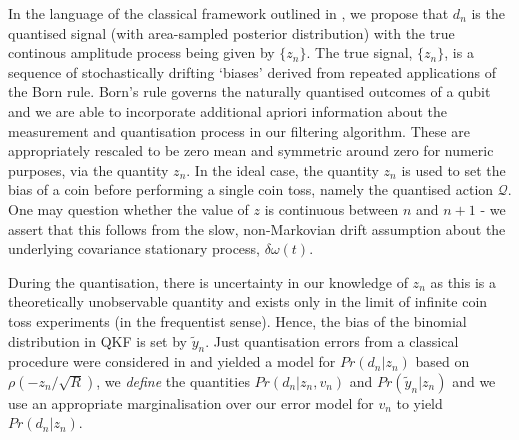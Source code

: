In the language of the classical framework outlined in \cite{karlsson2005, widrow1996}, we propose that $d_n$ is the quantised signal (with area-sampled posterior distribution) with the true continous amplitude process being given by $\{z_n \}$. The true signal, $\{z_n\}$, is a sequence of stochastically drifting `biases' derived from repeated applications of the Born rule. Born's rule governs the naturally quantised outcomes of a qubit and we are able to incorporate additional apriori information about the measurement and quantisation process in our filtering algorithm. These are appropriately rescaled to be zero mean and symmetric around zero for numeric purposes, via the quantity $z_n$. In the ideal case, the quantity $z_n$ is used to set the bias of a coin before performing a single coin toss, namely the quantised action $\mathcal{Q}$.  One may question whether the value of $z$ is continuous between $n$ and $n+1$ - we assert that this follows from the slow, non-Markovian drift assumption about the underlying covariance stationary process, $\delta \omega (t)$.  

During the quantisation, there is uncertainty in our knowledge of $z_n$ as this is a theoretically unobservable quantity and exists only in the limit of infinite coin toss experiments (in the frequentist sense). Hence, the bias  of the binomial distribution in QKF is set by $\tilde{y}_n$. Just quantisation errors  from a classical procedure were considered in \cite{karlsson2005} and yielded a model for $Pr(d_n | z_n)$ based on $\rho(-z_n/ \sqrt{R})$,  we \emph{define} the quantities $Pr(d_n | z_n, v_n)$ and $ Pr( \tilde{y}_n | z_n)$ and we use an appropriate marginalisation over our error model for $v_n$ to yield $Pr(d_n | z_n)$.


